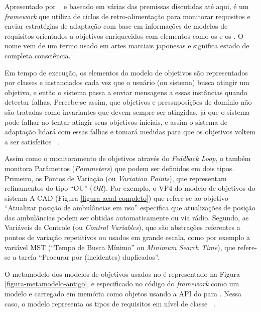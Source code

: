Apresentado por ~\cite{tesevitor} e baseado em várias das premissas discutidas até aqui, \zanshin é um \textit{framework} que utiliza de ciclos de retro-alimentação para monitorar requisitos e enviar estratégias de adaptação com base em informações de modelos de requisitos orientados a objetivos enriquecidos com elementos como os \awreqs e os \evoreqs. O nome \zanshin vem de um termo usado em artes marciais japonesas e significa estado de completa consciência.

Em tempo de execução, os elementos do modelo de objetivos são representados por classes e instanciados cada vez que o usuário (ou sistema) busca atingir um objetivo, e então o sistema passa a enviar mensagens a essas instâncias quando detectar falhas. Percebe-se assim, que objetivos e pressuposições de domínio não são tratadas como invariantes que devem sempre ser atingidas, já que o sistema pode falhar ao tentar atingir seus objetivos iniciais, e assim o sistema de adaptação lidará com essas falhas e tomará medidas para que os objetivos voltem a ser satisfeitos ~\cite{souza2013requirements}.

Assim como o monitoramento de objetivos através do \textit{Feddback Loop}, o \zanshin também monitora Parâmetros (\textit{Parameters}) que podem ser definidos em dois tipos. Primeiro, os Pontos de Variação (ou \textit{Variation Points}), que representam refinamentos do tipo ``OU'' (\textit{OR}). Por exemplo, o VP4 do modelo de objetivos do sistema A-CAD (Figura \ref{figura-acad-completo}) que refere-se ao objetivo ``Atualizar posição de ambulâncias em uso'' especifica que atualizações de posição das ambulâncias podem ser obtidas automaticamente ou via rádio. Segundo, as Variáveis de Controle (ou \textit{Control Variables}), que são abstrações referentes a pontos de variação repetitivos ou usados em grande escala, como por exemplo a variável MST (``Tempo de Busca Mínimo'' ou \textit{Minimum Search Time}), que refere-se a tarefa ``Procurar por (incidentes) duplicados''.

O metamodelo dos modelos de objetivos usados no \zanshin é representado na Figura \ref{figura-metamodelo-antigo}, e especificado no código do \textit{framework} como um modelo \emf e carregado em memória como objetos \java usando a API do \eclipse para \emf. Nessa caso, o modelo \emf representa os tipos de requisitos em nível de classe ~\cite{souza2013requirements}. 

